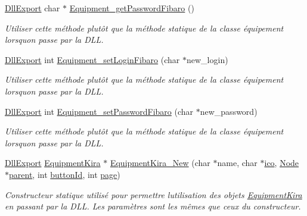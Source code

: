 \begin{DoxyCompactItemize}
\hyperlink{_room_8h_af83a0ad9d707a0bc5fe281b6e5c358a1}{Dll\+Export} char $\ast$ \hyperlink{namespace_e_p_af41fc4cfd8baff0841a5e5e9b8683707}{Equipment\+\_\+get\+Password\+Fibaro} ()
\begin{DoxyCompactList}\small\item\em Utiliser cette méthode plutôt que la méthode statique de la classe équipement lorsqu\textquotesingle{}on passe par la D\+LL. \end{DoxyCompactList}\item 
\hyperlink{_room_8h_af83a0ad9d707a0bc5fe281b6e5c358a1}{Dll\+Export} int \hyperlink{namespace_e_p_a7e0042ce73be5e3c82c2f6cf5c895c63}{Equipment\+\_\+set\+Login\+Fibaro} (char $\ast$new\+\_\+login)
\begin{DoxyCompactList}\small\item\em Utiliser cette méthode plutôt que la méthode statique de la classe équipement lorsqu\textquotesingle{}on passe par la D\+LL. \end{DoxyCompactList}\item 
\hyperlink{_room_8h_af83a0ad9d707a0bc5fe281b6e5c358a1}{Dll\+Export} int \hyperlink{namespace_e_p_a5f831818a0ad98813a95bde17cc0006e}{Equipment\+\_\+set\+Password\+Fibaro} (char $\ast$new\+\_\+password)
\begin{DoxyCompactList}\small\item\em Utiliser cette méthode plutôt que la méthode statique de la classe équipement lorsqu\textquotesingle{}on passe par la D\+LL. \end{DoxyCompactList}\item 
\hyperlink{_room_8h_af83a0ad9d707a0bc5fe281b6e5c358a1}{Dll\+Export} \hyperlink{class_e_p_1_1_equipment_kira}{Equipment\+Kira} $\ast$ \hyperlink{namespace_e_p_a20f61dbfa127f1979f29efdd0dbdb6a4}{Equipment\+Kira\+\_\+\+New} (char $\ast$name, char $\ast$\hyperlink{namespace_e_p_a9bb18717237cbb94269e26c77cc04b05}{ico}, \hyperlink{class_e_p_1_1_node}{Node} $\ast$\hyperlink{namespace_e_p_ae54856cdea91964313d781ec414f88fc}{parent}, int \hyperlink{namespace_e_p_af35e4c78a6ab0ddc628032ea5894199a}{button\+Id}, int \hyperlink{namespace_e_p_adb4f80317eaf1286f16eedd566da82ba}{page})
\begin{DoxyCompactList}\small\item\em Constructeur statique utilisé pour permettre l\textquotesingle{}utilisation des objets \hyperlink{class_e_p_1_1_equipment_kira}{Equipment\+Kira} en passant par la D\+LL. Les paramètres sont les mêmes que ceux du constructeur. \end{DoxyCompactList}\item 

\end{DoxyCompactItemize}
